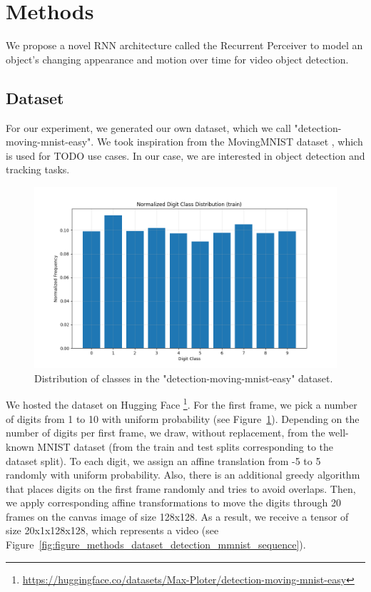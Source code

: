 \section{Methods}  \label{Methods}

We propose a novel RNN architecture called the Recurrent Perceiver to model an object's changing appearance and motion over time for video object detection.

\subsection{Dataset}

For our experiment, we generated our own dataset, which we call "detection-moving-mnist-easy". We took inspiration from the MovingMNIST dataset \cite{srivastava2016unsupervisedlearningvideorepresentations}, which is used for TODO use cases. In our case, we are interested in object detection and tracking tasks.

\begin{figure}
    \centering
    \includegraphics[width=\textwidth]{figures/figure_method_dataset_train_digit_classes.png}
    \caption{Distribution of classes in the "detection-moving-mnist-easy" dataset.}
    \label{fig:figure_method_dataset_train_digit_classes}
\end{figure}

We hosted the dataset on Hugging Face \footnote{\url{https://huggingface.co/datasets/Max-Ploter/detection-moving-mnist-easy}}. For the first frame, we pick a number of digits from 1 to 10 with uniform probability (see Figure~\ref{fig:figure_method_dataset_train_digit_classes}). Depending on the number of digits per first frame, we draw, without replacement, from the well-known MNIST dataset (from the train and test splits corresponding to the dataset split). To each digit, we assign an affine translation from -5 to 5 randomly with uniform probability. Also, there is an additional greedy algorithm that places digits on the first frame randomly and tries to avoid overlaps. Then, we apply corresponding affine transformations to move the digits through 20 frames on the canvas image of size 128x128. As a result, we receive a tensor of size 20x1x128x128, which represents a video (see Figure~\ref{fig:figure_methods_dataset_detection_mmnist_sequence}).


